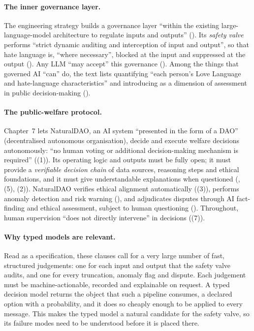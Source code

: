 \paragraph{The inner governance layer.}
The engineering strategy builds a governance layer ``within the existing large-language-model architecture to regulate inputs and outputs'' ().
Its \emph{safety valve} performs ``strict dynamic auditing and interception of input and output'', so that hate language is, ``where necessary'', blocked at the input and suppressed at the output ().
Any LLM ``may accept'' this governance ().
Among the things that governed AI ``can'' do, the text lists quantifying ``each person's Love Language and hate-language characteristics'' and introducing \pol{} as a dimension of assessment in public decision-making ().

\paragraph{The public-welfare protocol.}
Chapter~7 lets NaturalDAO, an AI system ``presented in the form of a DAO'' (decentralised autonomous organisation), decide and execute welfare decisions autonomously: ``no human voting or additional decision-making mechanism is required'' ((1)).
Its operating logic and outputs must be fully open; it must provide a \emph{verifiable decision chain} of data sources, reasoning steps and ethical foundations, and it must give understandable explanations when questioned (, (5), (2)).
NaturalDAO verifies ethical alignment automatically ((3)), performs anomaly detection and risk warning (), and adjudicates disputes through AI fact-finding and ethical assessment, subject to human questioning ().
Throughout, human supervision ``does not directly intervene'' in decisions ((7)).

\paragraph{Why typed models are relevant.}
Read as a specification, these clauses call for a very large number of fast, structured judgements: one for each input and output that the safety valve audits, and one for every truncation, anomaly flag and dispute.
Each judgement must be machine-actionable, recorded and explainable on request.
A typed decision model returns the object that such a pipeline consumes, a declared option with a probability, and it does so cheaply enough to be applied to every message.
This makes the typed model a natural candidate for the safety valve, so its failure modes need to be understood before it is placed there.

